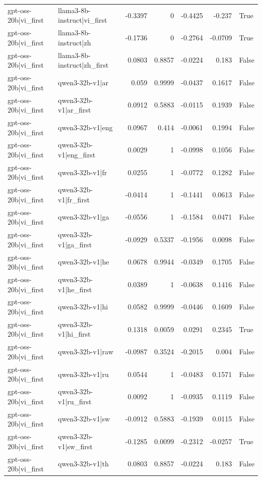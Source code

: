 \begin{table}
\begin{tabular}{l l r r r r l}
gpt-oss-20b|vi_first & llama3-8b-instruct|vi_first & -0.3397 & 0 & -0.4425 & -0.237 & True \\
gpt-oss-20b|vi_first & llama3-8b-instruct|zh & -0.1736 & 0 & -0.2764 & -0.0709 & True \\
gpt-oss-20b|vi_first & llama3-8b-instruct|zh_first & 0.0803 & 0.8857 & -0.0224 & 0.183 & False \\
gpt-oss-20b|vi_first & qwen3-32b-v1|ar & 0.059 & 0.9999 & -0.0437 & 0.1617 & False \\
gpt-oss-20b|vi_first & qwen3-32b-v1|ar_first & 0.0912 & 0.5883 & -0.0115 & 0.1939 & False \\
gpt-oss-20b|vi_first & qwen3-32b-v1|eng & 0.0967 & 0.414 & -0.0061 & 0.1994 & False \\
gpt-oss-20b|vi_first & qwen3-32b-v1|eng_first & 0.0029 & 1 & -0.0998 & 0.1056 & False \\
gpt-oss-20b|vi_first & qwen3-32b-v1|fr & 0.0255 & 1 & -0.0772 & 0.1282 & False \\
gpt-oss-20b|vi_first & qwen3-32b-v1|fr_first & -0.0414 & 1 & -0.1441 & 0.0613 & False \\
gpt-oss-20b|vi_first & qwen3-32b-v1|ga & -0.0556 & 1 & -0.1584 & 0.0471 & False \\
gpt-oss-20b|vi_first & qwen3-32b-v1|ga_first & -0.0929 & 0.5337 & -0.1956 & 0.0098 & False \\
gpt-oss-20b|vi_first & qwen3-32b-v1|he & 0.0678 & 0.9944 & -0.0349 & 0.1705 & False \\
gpt-oss-20b|vi_first & qwen3-32b-v1|he_first & 0.0389 & 1 & -0.0638 & 0.1416 & False \\
gpt-oss-20b|vi_first & qwen3-32b-v1|hi & 0.0582 & 0.9999 & -0.0446 & 0.1609 & False \\
gpt-oss-20b|vi_first & qwen3-32b-v1|hi_first & 0.1318 & 0.0059 & 0.0291 & 0.2345 & True \\
gpt-oss-20b|vi_first & qwen3-32b-v1|raw & -0.0987 & 0.3524 & -0.2015 & 0.004 & False \\
gpt-oss-20b|vi_first & qwen3-32b-v1|ru & 0.0544 & 1 & -0.0483 & 0.1571 & False \\
gpt-oss-20b|vi_first & qwen3-32b-v1|ru_first & 0.0092 & 1 & -0.0935 & 0.1119 & False \\
gpt-oss-20b|vi_first & qwen3-32b-v1|sw & -0.0912 & 0.5883 & -0.1939 & 0.0115 & False \\
gpt-oss-20b|vi_first & qwen3-32b-v1|sw_first & -0.1285 & 0.0099 & -0.2312 & -0.0257 & True \\
gpt-oss-20b|vi_first & qwen3-32b-v1|th & 0.0803 & 0.8857 & -0.0224 & 0.183 & False \\

\end{tabular}
\end{table}
